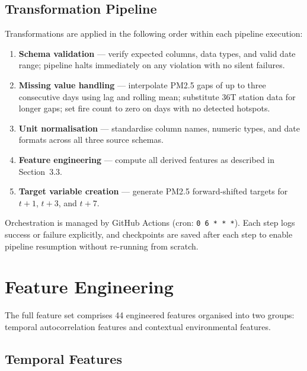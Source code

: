 \documentclass[12pt,a4paper]{report}
\begin{document}
\subsection{Transformation Pipeline}

Transformations are applied in the following order within each pipeline execution:

\begin{enumerate}
  \item \textbf{Schema validation} --- verify expected columns, data types, and valid date range; pipeline halts immediately on any violation with no silent failures.
  \item \textbf{Missing value handling} --- interpolate PM2.5 gaps of up to three consecutive days using lag and rolling mean; substitute 36T station data for longer gaps; set fire count to zero on days with no detected hotspots.
  \item \textbf{Unit normalisation} --- standardise column names, numeric types, and date formats across all three source schemas.
  \item \textbf{Feature engineering} --- compute all derived features as described in Section~3.3.
  \item \textbf{Target variable creation} --- generate PM2.5 forward-shifted targets for $t+1$, $t+3$, and $t+7$.
\end{enumerate}

Orchestration is managed by GitHub Actions (cron: \texttt{0 6 * * *}). Each step logs success or failure explicitly, and checkpoints are saved after each step to enable pipeline resumption without re-running from scratch.

\section{Feature Engineering}

The full feature set comprises 44 engineered features organised into two groups: temporal autocorrelation features and contextual environmental features.

\subsection{Temporal Features}
\end{document}
